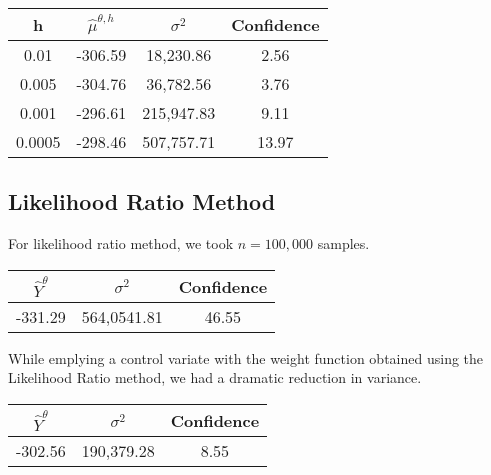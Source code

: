 \begin{longtable}[]{@{}cccc@{}}
\toprule
h & \(\hat \mu^{\theta, h}\) & \(\sigma^2\) & Confidence\tabularnewline
\midrule
\endhead
0.01 & -306.59 & 18,230.86 & 2.56\tabularnewline
0.005 & -304.76 & 36,782.56 & 3.76\tabularnewline
0.001 & -296.61 & 215,947.83 & 9.11\tabularnewline
0.0005 & -298.46 & 507,757.71 & 13.97\tabularnewline
\bottomrule
\end{longtable}

\subsection{Likelihood Ratio Method}\label{likelihood-ratio-method}

For likelihood ratio method, we took \(n = 100,000\) samples.

\begin{longtable}[]{@{}ccc@{}}
\toprule
\(\hat Y^{\theta}\) & \(\sigma^2\) & Confidence\tabularnewline
\midrule
\endhead
-331.29 & 564,0541.81 & 46.55\tabularnewline
\bottomrule
\end{longtable}

While emplying a control variate with the weight function obtained using
the Likelihood Ratio method, we had a dramatic reduction in variance.

\begin{longtable}[]{@{}ccc@{}}
\toprule
\(\hat Y^\theta\) & \(\sigma^2\) & Confidence\tabularnewline
\midrule
\endhead
-302.56 & 190,379.28 & 8.55\tabularnewline
\bottomrule
\end{longtable}
